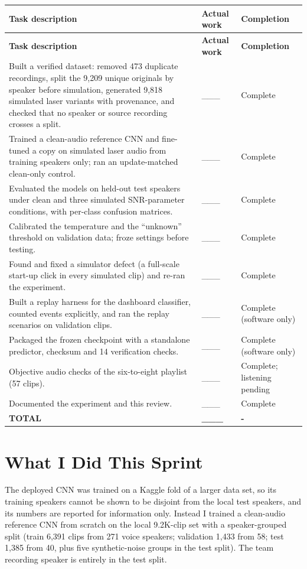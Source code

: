 \documentclass{article}
\begin{document}
\begin{longtable}{|p{4.35in}|>{\centering\arraybackslash}p{0.85in}|>{\centering\arraybackslash}p{1.0in}|}
\hline
\rowcolor{headerblue}\textbf{Task description} & \textbf{Actual work} & \textbf{Completion} \\ \hline
\endfirsthead
\hline
\rowcolor{headerblue}\textbf{Task description} & \textbf{Actual work} & \textbf{Completion} \\ \hline
\endhead
Built a verified dataset: removed 473 duplicate recordings, split the 9,209 unique originals by speaker before simulation, generated 9,818 simulated laser variants with provenance, and checked that no speaker or source recording crosses a split. & \_\_\_ & Complete \\ \hline
Trained a clean-audio reference CNN and fine-tuned a copy on simulated laser audio from training speakers only; ran an update-matched clean-only control. & \_\_\_ & Complete \\ \hline
Evaluated the models on held-out test speakers under clean and three simulated SNR-parameter conditions, with per-class confusion matrices. & \_\_\_ & Complete \\ \hline
Calibrated the temperature and the ``unknown'' threshold on validation data; froze settings before testing. & \_\_\_ & Complete \\ \hline
Found and fixed a simulator defect (a full-scale start-up click in every simulated clip) and re-ran the experiment. & \_\_\_ & Complete \\ \hline
Built a replay harness for the dashboard classifier, counted events explicitly, and ran the replay scenarios on validation clips. & \_\_\_ & Complete (software only) \\ \hline
Packaged the frozen checkpoint with a standalone predictor, checksum and 14 verification checks. & \_\_\_ & Complete (software only) \\ \hline
Objective audio checks of the six-to-eight playlist (57 clips). & \_\_\_ & Complete; listening pending \\ \hline
Documented the experiment and this review. & \_\_\_ & Complete \\ \hline
\textbf{TOTAL} & \textbf{\_\_\_} & \textbf{-} \\ \hline
\end{longtable}

\section{What I Did This Sprint}
The deployed CNN was trained on a Kaggle fold of a larger data set, so its training speakers cannot be shown to be disjoint from the local test speakers, and its numbers are reported for information only. Instead I trained a clean-audio reference CNN from scratch on the local 9.2K-clip set with a speaker-grouped split (train 6,391 clips from 271 voice speakers; validation 1,433 from 58; test 1,385 from 40, plus five synthetic-noise groups in the test split). The team recording speaker is entirely in the test split.
\end{document}
